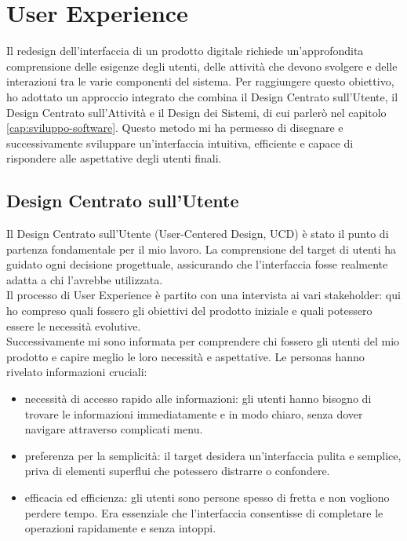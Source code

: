 \chapter{User Experience}
\label{cap:user-experience}

Il redesign dell'interfaccia di un prodotto digitale richiede un'approfondita comprensione delle esigenze degli utenti, delle attività che devono svolgere e delle interazioni tra le varie componenti del sistema. Per raggiungere questo obiettivo, ho adottato un approccio integrato che combina il Design Centrato sull'Utente, il Design Centrato sull'Attività e il Design dei Sistemi, di cui parlerò nel capitolo \ref{cap:sviluppo-software}. Questo metodo mi ha permesso di disegnare e successivamente sviluppare un'interfaccia intuitiva, efficiente e capace di rispondere alle aspettative degli utenti finali.

\section{Design Centrato sull'Utente}

Il Design Centrato sull'Utente (User-Centered Design, UCD) è stato il punto di partenza fondamentale per il mio lavoro. La comprensione del target di utenti ha guidato ogni decisione progettuale, assicurando che l'interfaccia fosse realmente adatta a chi l'avrebbe utilizzata.\\

Il processo di User Experience è partito con una intervista ai vari stakeholder: qui ho compreso quali fossero gli obiettivi del prodotto iniziale e quali potessero essere le necessità evolutive.\\
Successivamente mi sono informata per comprendere chi fossero gli utenti del mio prodotto e capire meglio le loro necessità e aspettative. Le personas hanno rivelato informazioni cruciali:
\begin{itemize}
    \item necessità di accesso rapido alle informazioni: gli utenti hanno bisogno di trovare le informazioni immediatamente e in modo chiaro, senza dover navigare attraverso complicati menu.
    \item preferenza per la semplicità: il target desidera un'interfaccia pulita e semplice, priva di elementi superflui che potessero distrarre o confondere.
    \item efficacia ed efficienza: gli utenti sono persone spesso di fretta e non vogliono perdere tempo. Era essenziale che l'interfaccia consentisse di completare le operazioni rapidamente e senza intoppi.
\end{itemize}

